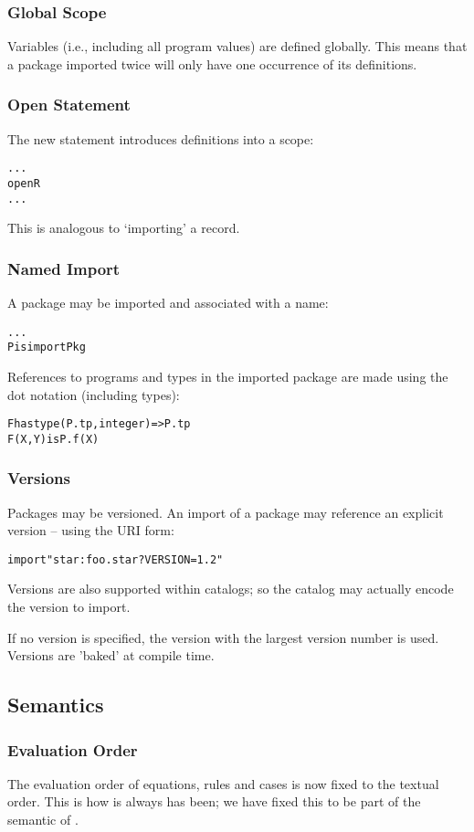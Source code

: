 \subsubsection{Global Scope}
Variables (i.e., including all program values) are defined globally. This means that a package imported twice will only have one occurrence of its definitions.

\subsubsection{Open Statement}
The new  statement introduces definitions into a scope:
\begin{alltt}
...
open R
...
\end{alltt}
This is analogous to `importing' a record.

\subsubsection{Named Import}
A package may be imported and associated with a name:
\begin{alltt}
...
P is import Pkg
\end{alltt}
References to programs and types in the imported package are made using the dot notation (including types):
\begin{alltt}
F has type (P.tp,integer)=>P.tp
F(X,Y) is P.f(X)
\end{alltt}

\subsubsection{Versions}
Packages may be versioned. An import of a package may reference an explicit version -- using the URI form:
\begin{alltt}
import "star:foo.star?VERSION=1.2"
\end{alltt}
Versions are also supported within catalogs; so the catalog may actually encode the version to import.

If no version is specified, the version with the largest version number is used. Versions are 'baked' at compile time.

\subsection{Semantics}
\subsubsection{Evaluation Order}
The evaluation order of equations, rules and cases is now fixed to the textual order. This is how is always has been; we have fixed this to be part of the semantic of \Sr.

